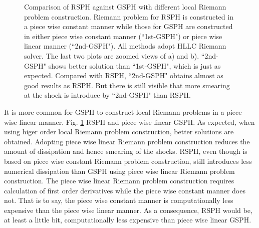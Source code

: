\documentclass[preprint,12pt,authoryear]{elsarticle}
\begin{document}
\begin{figure}[H]
\begin{minipage}{.545\textwidth}
\begin{flushleft}
        \end{flushleft}
    \end{minipage}%
    \caption{Comparison of RSPH against GSPH with different local Riemann problem construction. Riemann problem for RSPH is constructed in a piece wise constant manner while those for GSPH are constructed in either piece wise constant manner (``1st-GSPH") or piece wise linear manner (``2nd-GSPH"). All methods adopt HLLC Riemann solver. The last two plots are zoomed views of a) and b). ``2nd-GSPH" shows better solution than ``1st-GSPH", which is just as expected. Compared with RSPH, ``2nd-GSPH" obtains almost as good results as RSPH. But there is still visible that more smearing at the shock is introduce by ``2nd-GSPH" than RSPH.}
    \label{fig:RCM-Sod-GSPH2}
\end{figure}

It is more common for GSPH to construct local Riemann problems in a piece wise linear manner. Fig. \ref{fig:RCM-Sod-GSPH2} RSPH and piece wise linear GSPH. As expected, when using higer order local Riemann problem construction, better solutions are obtained. Adopting piece wise linear Riemann problem construction reduces the amount of dissipation and hence smearing of the shocks. RSPH, even though is based on piece wise constant Riemann problem construction, still introduces less numerical dissipation than GSPH using piece wise linear Riemann problem construction. The piece wise linear Riemann problem construction requires calculation of first order derivatives while the piece wise constant manner does not. That is to say, the piece wise constant manner is computationally less expensive than the piece wise linear manner. As a consequence, RSPH would be, at least a little bit, computationally less expensive than piece wise linear GSPH.
\end{document}
